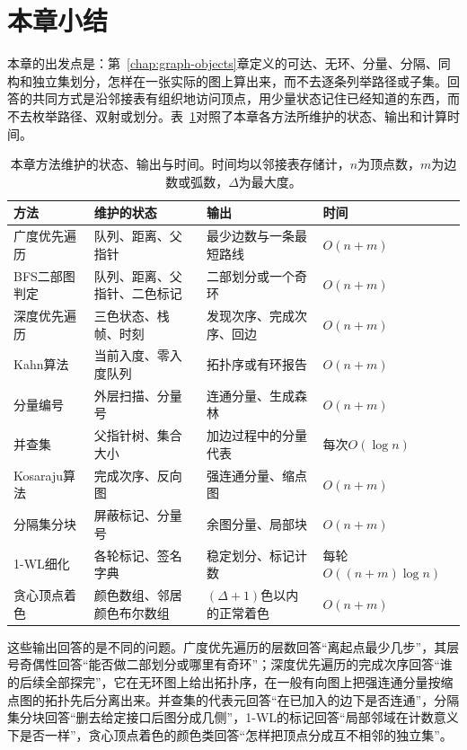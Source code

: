 \section{本章小结}
\label{sec:graph-traversal-summary}

本章的出发点是：第~\ref{chap:graph-objects}章定义的可达、无环、分量、分隔、同构和独立集划分，怎样在一张实际的图上算出来，而不去逐条列举路径或子集。回答的共同方式是沿邻接表有组织地访问顶点，用少量状态记住已经知道的东西，而不去枚举路径、双射或划分。表~\ref{tab:graph-trav-summary}对照了本章各方法所维护的状态、输出和计算时间。

\begin{table}[!htb]
  \centering
  \small
  \begin{tabular}{@{}llll@{}}
    \toprule
    方法 & 维护的状态 & 输出 & 时间 \\
    \midrule
    广度优先遍历 & 队列、距离、父指针 & 最少边数与一条最短路线 & $O(n+m)$ \\
    BFS二部图判定 & 队列、距离、父指针、二色标记 & 二部划分或一个奇环 & $O(n+m)$ \\
    深度优先遍历 & 三色状态、栈帧、时刻 & 发现次序、完成次序、回边 & $O(n+m)$ \\
    Kahn算法 & 当前入度、零入度队列 & 拓扑序或有环报告 & $O(n+m)$ \\
    分量编号 & 外层扫描、分量号 & 连通分量、生成森林 & $O(n+m)$ \\
    并查集 & 父指针树、集合大小 & 加边过程中的分量代表 & 每次$O(\log n)$ \\
    Kosaraju算法 & 完成次序、反向图 & 强连通分量、缩点图 & $O(n+m)$ \\
    分隔集分块 & 屏蔽标记、分量号 & 余图分量、局部块 & $O(n+m)$ \\
    1-WL细化 & 各轮标记、签名字典 & 稳定划分、标记计数 & 每轮$O((n+m)\log n)$ \\
    贪心顶点着色 & 颜色数组、邻居颜色布尔数组 & $(\Delta+1)$色以内的正常着色 & $O(n+m)$ \\
    \bottomrule
  \end{tabular}
  \caption{本章方法维护的状态、输出与时间。时间均以邻接表存储计，$n$为顶点数，$m$为边数或弧数，$\Delta$为最大度。}
  \label{tab:graph-trav-summary}
\end{table}

这些输出回答的是不同的问题。广度优先遍历的层数回答“离起点最少几步”，其层号奇偶性回答“能否做二部划分或哪里有奇环”；深度优先遍历的完成次序回答“谁的后续全部探完”，它在无环图上给出拓扑序，在一般有向图上把强连通分量按缩点图的拓扑先后分离出来。并查集的代表元回答“在已加入的边下是否连通”，分隔集分块回答“删去给定接口后图分成几侧”，1-WL的标记回答“局部邻域在计数意义下是否一样”，贪心顶点着色的颜色类回答“怎样把顶点分成互不相邻的独立集”。


